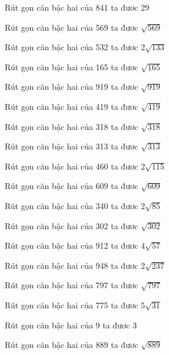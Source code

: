 \documentclass[12pt,a4paper]{article}
\begin{document}
\begin{ex}
Rút gọn căn bậc hai của 841 ta đươc $29$
\end{ex}
\begin{ex}
Rút gọn căn bậc hai của 569 ta đươc $\sqrt{569}$
\end{ex}
\begin{ex}
Rút gọn căn bậc hai của 532 ta đươc $2\sqrt{133}$
\end{ex}
\begin{ex}
Rút gọn căn bậc hai của 165 ta đươc $\sqrt{165}$
\end{ex}
\begin{ex}
Rút gọn căn bậc hai của 919 ta đươc $\sqrt{919}$
\end{ex}
\begin{ex}
Rút gọn căn bậc hai của 419 ta đươc $\sqrt{419}$
\end{ex}
\begin{ex}
Rút gọn căn bậc hai của 318 ta đươc $\sqrt{318}$
\end{ex}
\begin{ex}
Rút gọn căn bậc hai của 313 ta đươc $\sqrt{313}$
\end{ex}
\begin{ex}
Rút gọn căn bậc hai của 460 ta đươc $2\sqrt{115}$
\end{ex}
\begin{ex}
Rút gọn căn bậc hai của 609 ta đươc $\sqrt{609}$
\end{ex}
\begin{ex}
Rút gọn căn bậc hai của 340 ta đươc $2\sqrt{85}$
\end{ex}
\begin{ex}
Rút gọn căn bậc hai của 302 ta đươc $\sqrt{302}$
\end{ex}
\begin{ex}
Rút gọn căn bậc hai của 912 ta đươc $4\sqrt{57}$
\end{ex}
\begin{ex}
Rút gọn căn bậc hai của 948 ta đươc $2\sqrt{237}$
\end{ex}
\begin{ex}
Rút gọn căn bậc hai của 797 ta đươc $\sqrt{797}$
\end{ex}
\begin{ex}
Rút gọn căn bậc hai của 775 ta đươc $5\sqrt{31}$
\end{ex}
\begin{ex}
Rút gọn căn bậc hai của 9 ta đươc $3$
\end{ex}
\begin{ex}
Rút gọn căn bậc hai của 889 ta đươc $\sqrt{889}$
\end{ex}
\end{document}
